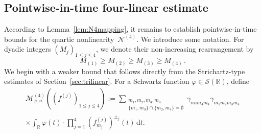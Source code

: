 \documentclass[11pt,reqno,english]{amsart}
\numberwithin{equation}{section}
\theoremstyle{plain}
\theoremstyle{definition}
\theoremstyle{remark}
\newcommand{\R}{\mathbb{R}}
\newcommand{\dd}{\mathrm{d}}
\begin{document}
\subsection{Pointwise-in-time four-linear estimate}

According to Lemma~\ref{lem:N4mapping}, it remains to establish pointwise-in-time bounds for the quartic nonlinearity~$\mathcal{N}^{(4)}$. We introduce some notation. For dyadic integers $(M_j)_{1\leq j\leq 4}$, we denote their non-increasing rearrangement by 
\[
M_{(1)}\geq M_{(2)}\geq M_{(3)}\geq M_{(4)}\,.
\] 
We begin with a weaker bound that follows directly from the Strichartz-type estimates of Section~\ref{sec:trilinear}.
For a Schwartz function $\varphi\in \mathcal{S}(\R)$, define
\begin{multline}\label{def:M4n}
	\mathcal{M}_{\varphi,n}^{(4)}((f^{(j)})_{1\leq j\leq 4})
	:=
	\sum_{\substack{m_1,m_2,m_3,m_4\\
			\{m_1,m_3\}\cap\{m_2,m_4\}=\emptyset}}\gamma_{nnm_4m_4}\gamma_{m_1m_2m_3m_4}
	\\
	\times\int_{\R} \varphi(t)\cdot \prod_{j=1}^4 (f_{m_j}^{(j)})^{\pm_j}(t)\, \dd t.
\end{multline}
\end{document}
